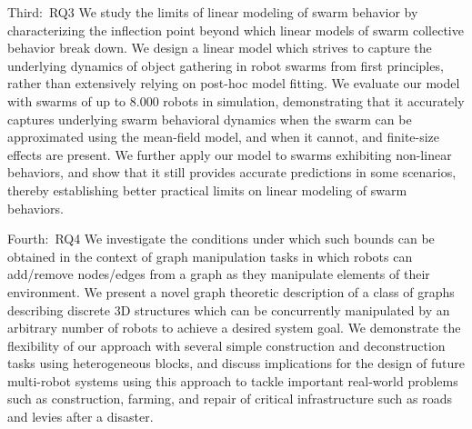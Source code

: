 
Third:~\glsdesc{RQ3} We study the limits of linear modeling of swarm behavior by
characterizing the inflection point beyond which linear models of swarm
collective behavior break down. We design a linear model which strives to
capture the underlying dynamics of object gathering in robot swarms from first
principles, rather than extensively relying on post-hoc model fitting.  We
evaluate our model with swarms of up to \num{8,000} robots in simulation,
demonstrating that it accurately captures underlying swarm behavioral dynamics
when the swarm can be approximated using the mean-field model, and when it
cannot, and finite-size effects are present.  We further apply our model to
swarms exhibiting non-linear behaviors, and show that it still provides accurate
predictions in some scenarios, thereby establishing better practical limits on
linear modeling of swarm behaviors.

Fourth:~\glsdesc{RQ4} We investigate the conditions under which such bounds can
be obtained in the context of graph manipulation tasks in which robots can
add/remove nodes/edges from a graph as they manipulate elements of their
environment. We present a novel graph theoretic description of a class of graphs
describing discrete 3D structures which can be concurrently manipulated by an
arbitrary number of robots to achieve a desired system goal. We demonstrate the
flexibility of our approach with several simple construction and deconstruction
tasks using heterogeneous blocks, and discuss implications for the design of
future multi-robot systems using this approach to tackle important real-world
problems such as construction, farming, and repair of critical infrastructure
such as roads and levies after a disaster.
